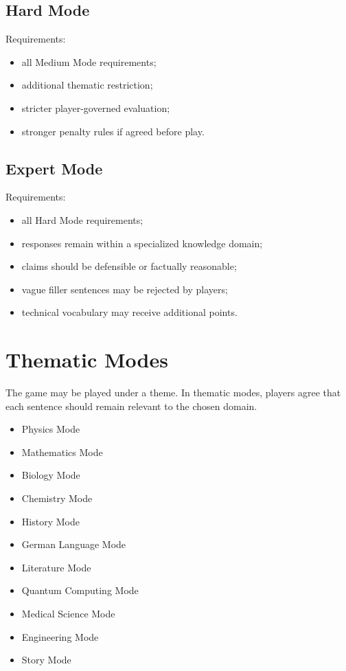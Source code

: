 \documentclass[11pt,a4paper]{article}
\begin{document}
\subsection{Hard Mode}

Requirements:

\begin{itemize}
    \item all Medium Mode requirements;
    \item additional thematic restriction;
    \item stricter player-governed evaluation;
    \item stronger penalty rules if agreed before play.
\end{itemize}

\subsection{Expert Mode}

Requirements:

\begin{itemize}
    \item all Hard Mode requirements;
    \item responses remain within a specialized knowledge domain;
    \item claims should be defensible or factually reasonable;
    \item vague filler sentences may be rejected by players;
    \item technical vocabulary may receive additional points.
\end{itemize}

\section{Thematic Modes}

The game may be played under a theme. In thematic modes, players agree that each sentence should remain relevant to the chosen domain.

\begin{itemize}
    \item Physics Mode
    \item Mathematics Mode
    \item Biology Mode
    \item Chemistry Mode
    \item History Mode
    \item German Language Mode
    \item Literature Mode
    \item Quantum Computing Mode
    \item Medical Science Mode
    \item Engineering Mode
    \item Story Mode
\end{itemize}
\end{document}
